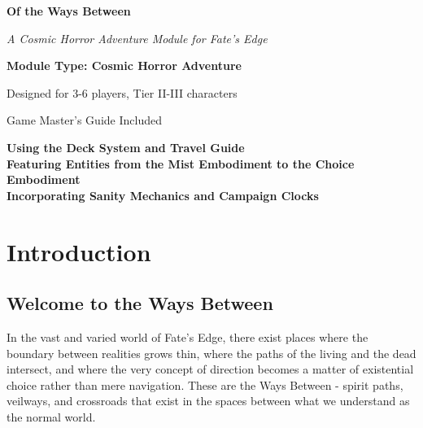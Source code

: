 \documentclass[11pt]{article}
\begin{document}
\begin{titlepage}
\centering
\vspace*{2cm}

{\Huge\bfseries\color{headercolor} Of the Ways Between} 

\vspace{0.5cm}

{\Large\itshape A Cosmic Horror Adventure Module for Fate's Edge}

\vspace{2cm}

\vspace{2cm}

{\Large\bfseries Module Type: Cosmic Horror Adventure}

\vspace{1cm}

{\large Designed for 3-6 players, Tier II-III characters}

\vspace{1cm}

{\large Game Master's Guide Included}

\vfill

{\large 
\textbf{Using the Deck System and Travel Guide} \\
\textbf{Featuring Entities from the Mist Embodiment to the Choice Embodiment} \\
\textbf{Incorporating Sanity Mechanics and Campaign Clocks}
}

\end{titlepage}

\newpage

\tableofcontents

\newpage

\section{Introduction}

\subsection{Welcome to the Ways Between}

In the vast and varied world of Fate's Edge, there exist places where the boundary between realities grows thin, where the paths of the living and the dead intersect, and where the very concept of direction becomes a matter of existential choice rather than mere navigation. These are the Ways Between - spirit paths, veilways, and crossroads that exist in the spaces between what we understand as the normal world.
\end{document}
